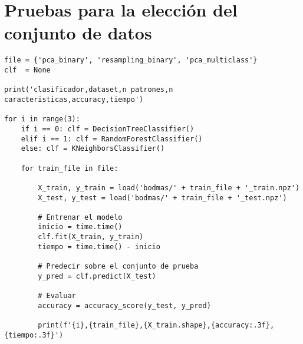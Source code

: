 \newpage
\section{Pruebas para la elección del conjunto de datos}
\label{sec:select_dataset}

\lstset{style=codestyle, language=Python}
\begin{lstlisting}[frame=single]
file = {'pca_binary', 'resampling_binary', 'pca_multiclass'}
clf  = None

print('clasificador,dataset,n patrones,n caracteristicas,accuracy,tiempo')

for i in range(3):
	if i == 0: clf = DecisionTreeClassifier()
	elif i == 1: clf = RandomForestClassifier()
	else: clf = KNeighborsClassifier()

	for train_file in file:

		X_train, y_train = load('bodmas/' + train_file + '_train.npz')
		X_test, y_test = load('bodmas/' + train_file + '_test.npz')

		# Entrenar el modelo
		inicio = time.time()
		clf.fit(X_train, y_train)
		tiempo = time.time() - inicio

		# Predecir sobre el conjunto de prueba
		y_pred = clf.predict(X_test)

		# Evaluar
		accuracy = accuracy_score(y_test, y_pred)

		print(f'{i},{train_file},{X_train.shape},{accuracy:.3f},{tiempo:.3f}')

\end{lstlisting}

